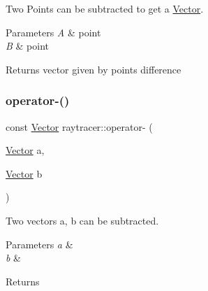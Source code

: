 Two Points can be subtracted to get a \hyperlink{classraytracer_1_1Vector}{Vector}. 


\begin{DoxyParams}{Parameters}
{\em A} & point \\
\hline
{\em B} & point \\
\hline
\end{DoxyParams}
\begin{DoxyReturn}{Returns}
vector given by points difference 
\end{DoxyReturn}
\mbox{\label{group__api_ga39d9dfe9600eef5b1e29f0baebc65e1c}} 
\subsubsection{\texorpdfstring{operator-\/()}{operator-()}\hspace{0.1cm}{\footnotesize\ttfamily [2/2]}}
{\footnotesize\ttfamily const \hyperlink{classraytracer_1_1Vector}{Vector} raytracer\+::operator-\/ (\begin{DoxyParamCaption}\item[{\hyperlink{classraytracer_1_1Vector}{Vector}}]{a,  }\item[{\hyperlink{classraytracer_1_1Vector}{Vector}}]{b }\end{DoxyParamCaption})}



Two vectors a, b can be subtracted. 


\begin{DoxyParams}{Parameters}
{\em a} & \\
\hline
{\em b} & \\
\hline
\end{DoxyParams}
\begin{DoxyReturn}{Returns}

\end{DoxyReturn}
